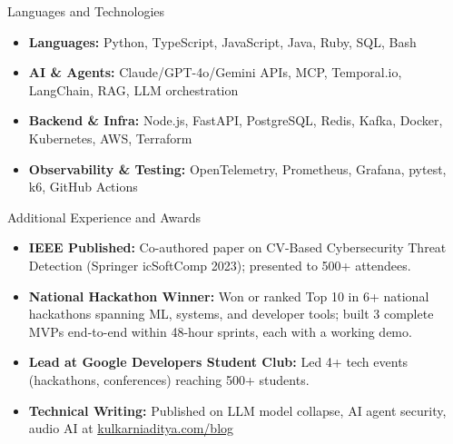 \documentclass[]{mcdowellcv}
\begin{document}
\begin{cvsection}{Languages and Technologies}
  \begin{cvsubsection}{}{}{}
    \begin{itemize}
      \item \textbf{Languages:} Python, TypeScript, JavaScript, Java, Ruby, SQL, Bash
      \item \textbf{AI \& Agents:} Claude/GPT-4o/Gemini APIs, MCP, Temporal.io, LangChain, RAG, LLM orchestration
      \item \textbf{Backend \& Infra:} Node.js, FastAPI, PostgreSQL, Redis, Kafka, Docker, Kubernetes, AWS, Terraform
      \item \textbf{Observability \& Testing:} OpenTelemetry, Prometheus, Grafana, pytest, k6, GitHub Actions
    \end{itemize}
  \end{cvsubsection}
\end{cvsection}

\begin{cvsection}{Additional Experience and Awards}
  \begin{cvsubsection}{}{}{}
    \begin{itemize}
      \item \textbf{IEEE Published:} Co-authored paper on CV-Based Cybersecurity Threat Detection (Springer icSoftComp 2023); presented to 500+ attendees.
      \item \textbf{National Hackathon Winner:} Won or ranked Top 10 in 6+ national hackathons spanning ML, systems, and developer tools; built 3 complete MVPs end-to-end within 48-hour sprints, each with a working demo.
      \item \textbf{Lead at Google Developers Student Club:} Led 4+ tech events (hackathons, conferences) reaching 500+ students.
      \item \textbf{Technical Writing:} Published on LLM model collapse, AI agent security, audio AI at \href{https://www.kulkarniaditya.com/blog}{kulkarniaditya.com/blog}
    \end{itemize}
  \end{cvsubsection}
\end{cvsection}
\end{document}
